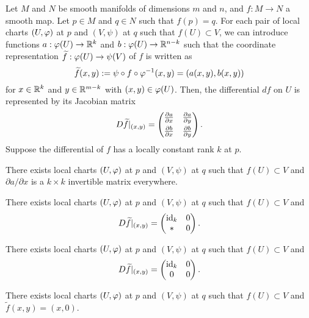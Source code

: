 \documentclass{../../large}
\begin{document}
\begin{prb}
Let $M$ and $N$ be smooth manifolds of dimensions $m$ and $n$, and $f:M\to N$ a smooth map.
Let $p\in M$ and $q\in N$ such that $f(p)=q$.
For each pair of local charts $(U,\varphi)$ at $p$ and $(V,\psi)$ at $q$ such that $f(U)\subset V$, we can introduce functions $a:\varphi(U)\to\mathbb{R}^k$ and $b:\varphi(U)\to\mathbb{R}^{n-k}$ such that the coordinate representation $\widetilde f:\varphi(U)\to\psi(V)$ of $f$ is written as
\[\widetilde f(x,y):=\psi\circ f\circ\varphi^{-1}(x,y)=(a(x,y),b(x,y))\]
for $x\in\mathbb{R}^k$ and $y\in\mathbb{R}^{m-k}$ with $(x,y)\in\varphi(U)$.
Then, the differential $df$ on $U$ is represented by its Jacobian matrix
\[
D\tilde f|_{(x,y)}=\mat{\pd{a}{x}&\pd{a}{y}\\[4pt]\pd{b}{x}&\pd{b}{y}}.\]
Suppose the differential of $f$ has a locally constant rank $k$ at $p$.
\begin{parts}
\item There exists local charts $(U,\varphi)$ at $p$ and $(V,\psi)$ at $q$ such that $f(U)\subset V$ and $\partial a/\partial x$ is a $k\times k$ invertible matrix everywhere.
\item There exists local charts $(U,\varphi)$ at $p$ and $(V,\psi)$ at $q$ such that $f(U)\subset V$ and
\[D\widetilde f|_{(x,y)}=\begin{pmatrix}\operatorname{id}_k&0\\\ast&0\end{pmatrix}.\]
\item There exists local charts $(U,\varphi)$ at $p$ and $(V,\psi)$ at $q$ such that $f(U)\subset V$ and
\[D\widetilde f|_{(x,y)}=\begin{pmatrix}\operatorname{id}_k&0\\0&0\end{pmatrix}.\]
\item There exists local charts $(U,\varphi)$ at $p$ and $(V,\psi)$ at $q$ such that $f(U)\subset V$ and $\tilde f(x,y)=(x,0)$.
\end{parts}
\end{prb}
\end{document}
